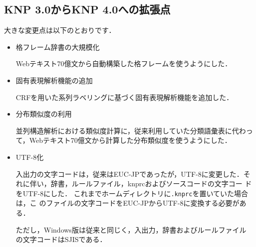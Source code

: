 \documentclass[a4j,11pt,titlepage]{jarticle}
\begin{document}
\subsection{KNP 3.0からKNP 4.0への拡張点}

大きな変更点は以下のとおりです．
\begin{itemize}
 \item 格フレーム辞書の大規模化

       Webテキスト70億文から自動構築した格フレームを使うようにした．

 \item 固有表現解析機能の追加

       CRFを用いた系列ラベリングに基づく固有表現解析機能を追加した．

 \item 分布類似度の利用

       並列構造解析における類似度計算に，従来利用していた分類語彙表に代わっ
       て，Webテキスト70億文から計算した分布類似度を使うようにした．

 \item UTF-8化

       入出力の文字コードは，従来はEUC-JPであったが，UTF-8に変更した．そ
       れに伴い，辞書，ルールファイル，knprcおよびソースコードの文字コー
       ドをUTF-8にした．
       これまでホームディレクトリに\texttt{.knprc}を置いていた場合は，こ
       のファイルの文字コードをEUC-JPからUTF-8に変換する必要がある．

       ただし，Windows版は従来と同じく，入出力，辞書およびルールファイル
       の文字コードはSJISである．
\end{itemize}
\end{document}
